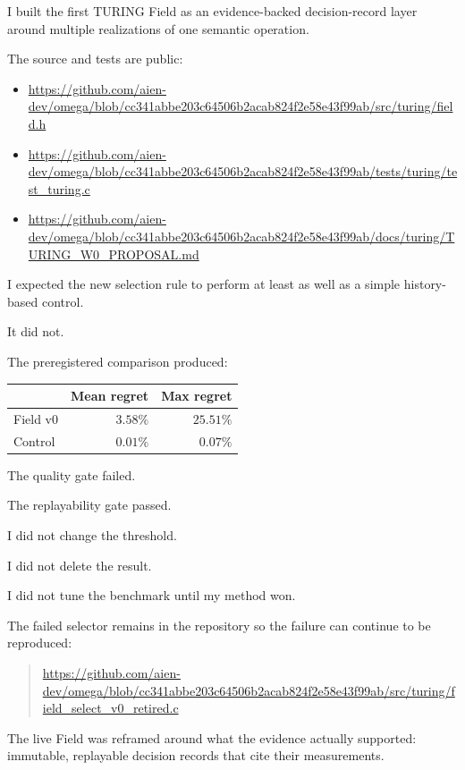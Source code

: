 \documentclass[11pt]{article}
\begin{document}
I built the first TURING Field as an evidence-backed decision-record layer around multiple realizations of one semantic operation.

The source and tests are public:

\begin{itemize}
    \item \url{https://github.com/aien-dev/omega/blob/cc341abbe203c64506b2acab824f2e58e43f99ab/src/turing/field.h}
    \item \url{https://github.com/aien-dev/omega/blob/cc341abbe203c64506b2acab824f2e58e43f99ab/tests/turing/test_turing.c}
    \item \url{https://github.com/aien-dev/omega/blob/cc341abbe203c64506b2acab824f2e58e43f99ab/docs/turing/TURING_W0_PROPOSAL.md}
\end{itemize}

I expected the new selection rule to perform at least as well as a simple history-based control.

It did not.

The preregistered comparison produced:

\begin{center}
\begin{tabular}{lrr}
\toprule
 & Mean regret & Max regret\\
\midrule
Field v0 & \(3.58\%\) & \(25.51\%\)\\
Control & \(0.01\%\) & \(0.07\%\)\\
\bottomrule
\end{tabular}
\end{center}

The quality gate failed.

The replayability gate passed.

I did not change the threshold.

I did not delete the result.

I did not tune the benchmark until my method won.

The failed selector remains in the repository so the failure can continue to be reproduced:

\begin{quote}
\url{https://github.com/aien-dev/omega/blob/cc341abbe203c64506b2acab824f2e58e43f99ab/src/turing/field_select_v0_retired.c}
\end{quote}

The live Field was reframed around what the evidence actually supported: immutable, replayable decision records that cite their measurements.
\end{document}
